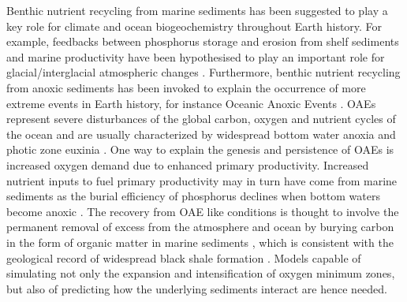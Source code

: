 \documentclass[gmd, manuscript]{copernicus}
\begin{document}
Benthic nutrient recycling from marine sediments has been suggested to play a key role for climate and ocean biogeochemistry throughout Earth history. 
For example, feedbacks between phosphorus storage and erosion from shelf sediments and marine productivity have been hypothesised to play an important role for glacial/interglacial atmospheric  changes \citep{broecker_ocean_1982, ruttenberg_reassessment_1993}. 
Furthermore, benthic nutrient recycling from anoxic sediments has been invoked to explain the occurrence of more extreme events in Earth history, for instance Oceanic Anoxic Events %
\citep[OAEs, e.g.][]{van_cappellen_benthic_1994, mort_phosphorus_2007, tsandev_modeling_2009}. OAEs represent severe disturbances of the global carbon, oxygen and nutrient cycles of the ocean and are usually characterized 
by widespread bottom water anoxia and photic zone euxinia \citep{jenkyns_geochemistry_2010}. 
One way to explain the genesis and persistence of OAEs is increased oxygen demand due to enhanced primary productivity. Increased nutrient inputs to fuel primary productivity may in turn have come from marine sediments as the 
burial efficiency of phosphorus declines when bottom waters become anoxic \citep{ingall_evidence_1994, van_cappellen_benthic_1994}. 
The recovery from OAE like conditions is thought to involve the permanent removal of excess  from the atmosphere and ocean by burying carbon in the form of organic matter in marine sediments 
\citep[e.g.][]{arthur_geochemical_1988, jarvis_black_2011}, which is consistent with the geological record of widespread black shale formation \citep{stein_accumulation_1986}. 
Models capable of simulating not only the expansion and intensification of oxygen minimum zones, but also of predicting how the underlying sediments interact are hence needed. 

\end{document}
